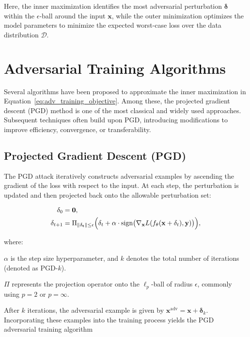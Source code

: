 \documentclass[10pt,twocolumn,letterpaper]{article}
\begin{document}
Here, the inner maximization identifies the most adversarial perturbation $\mathbf{\delta}$ within the $\epsilon$-ball around the input $\mathbf{x}$, while the outer minimization optimizes the model parameters to minimize the expected worst-case loss over the data distribution $\mathcal{D}$.

\section{Adversarial Training Algorithms}
Several algorithms have been proposed to approximate the inner maximization in Equation~\eqref{eq:adv_training_objective}. Among these, the projected gradient descent (PGD) method is one of the most classical and widely used approaches. Subsequent techniques often build upon PGD, introducing modifications to improve efficiency, convergence, or transferability.

\subsection{Projected Gradient Descent (PGD)}
The PGD attack iteratively constructs adversarial examples by ascending the gradient of the loss with respect to the input. At each step, the perturbation is updated and then projected back onto the allowable perturbation set:

$$
\begin{aligned}
\mathbf{\delta}_{0} &= \mathbf{0}, \\
\mathbf{\delta}_{t+1} &= \Pi_{{\lVert \mathbf{\delta_t} \rVert \le \epsilon}} \Bigl(\mathbf{\delta}_{t} + \alpha \cdot \mathrm{sign}\bigl(\nabla_{\mathbf{x}} L(f_{\theta}(\mathbf{x} + \mathbf{\delta}_{t}), \mathbf{y})\bigr)\Bigr),
\end{aligned}
$$

where:

$\alpha$ is the step size hyperparameter, and $k$ denotes the total number of iterations (denoted as PGD-$k$).

$\Pi$ represents the projection operator onto the $\ell_{p}$-ball of radius $\epsilon$, commonly using $p=2$ or $p=\infty$.

After $k$ iterations, the adversarial example is given by $\mathbf{x}^{\mathrm{adv}} = \mathbf{x} + \mathbf{\delta}_{k}$. Incorporating these examples into the training process yields the PGD adversarial training algorithm
\end{document}
